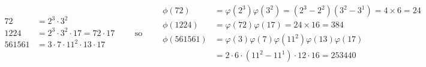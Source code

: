 \documentclass[11pt]{article}
\begin{document}
\[
  \begin{array}{rl}
        72 &= 2^3\cdot3^2\\
      1224 &= 2^3\cdot3^2\cdot 17 = 72\cdot 17\\
    561561 &= 3  \cdot 7 \cdot 11^2 \cdot 13 \cdot 17\\
  \end{array}
  \qquad\text{so}\qquad
  \begin{array}{rl}
    \phi(72)     &= \varphi(2^3)\varphi(3^2) = (2^3 - 2^2)(3^2 - 3^1) = 4\times 6 = 24\\
    \phi(1224)   &= \varphi(72)\varphi(17) = 24\times 16 = 384\\
    \phi(561561) &= \varphi(3)\varphi(7)\varphi(11^2)\varphi(13)\varphi(17)\\
                 &= 2\cdot 6\cdot (11^2-11^1)\cdot12\cdot16
                  = 253440
  \end{array}
\]
\end{document}
